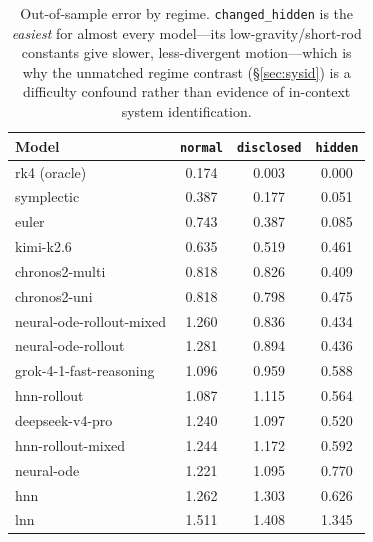 \documentclass{article}
\begin{document}
\begin{table}[h]
\centering\small
\caption{Out-of-sample error by regime. \texttt{changed\_hidden} is the \emph{easiest}
for almost every model---its low-gravity/short-rod constants give slower, less-divergent
motion---which is why the unmatched regime contrast (\S\ref{sec:sysid}) is a difficulty
confound rather than evidence of in-context system identification.}
\label{tab:perregime}
\begin{tabular}{lccc}
\toprule
Model & \texttt{normal} & \texttt{disclosed} & \texttt{hidden} \\
\midrule
rk4 (oracle) & 0.174 & 0.003 & 0.000 \\
symplectic & 0.387 & 0.177 & 0.051 \\
euler & 0.743 & 0.387 & 0.085 \\
kimi-k2.6 & 0.635 & 0.519 & 0.461 \\
chronos2-multi & 0.818 & 0.826 & 0.409 \\
chronos2-uni & 0.818 & 0.798 & 0.475 \\
neural-ode-rollout-mixed & 1.260 & 0.836 & 0.434 \\
neural-ode-rollout & 1.281 & 0.894 & 0.436 \\
grok-4-1-fast-reasoning & 1.096 & 0.959 & 0.588 \\
hnn-rollout & 1.087 & 1.115 & 0.564 \\
deepseek-v4-pro & 1.240 & 1.097 & 0.520 \\
hnn-rollout-mixed & 1.244 & 1.172 & 0.592 \\
neural-ode & 1.221 & 1.095 & 0.770 \\
hnn & 1.262 & 1.303 & 0.626 \\
lnn & 1.511 & 1.408 & 1.345 \\
\bottomrule
\end{tabular}
\end{table}
\end{document}
